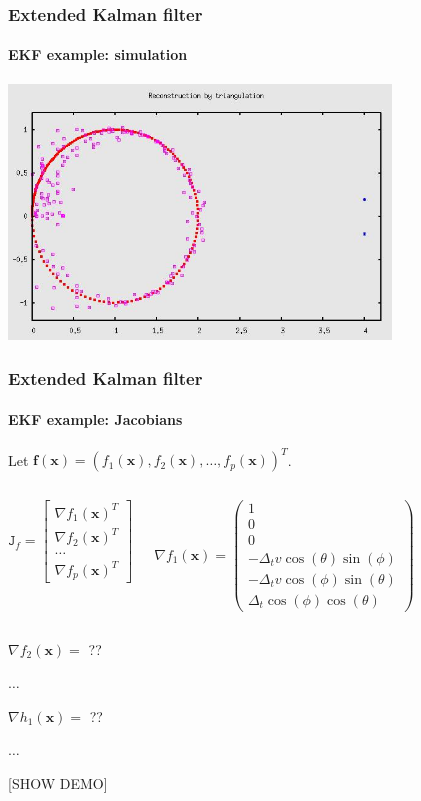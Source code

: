 \documentclass[aspectratio=169]{beamer}
\renewcommand{\vec}[1]{\boldsymbol{#1}}
\newcommand{\mat}[1]{\mathtt{#1}}
\begin{document}
\begin{frame}
\frametitle{Extended Kalman filter}
\framesubtitle{EKF example: simulation}
\begin{center}
\includegraphics[width=4in]{triangulate}
\end{center}
\end{frame}

\begin{frame}
\frametitle{Extended Kalman filter}
\framesubtitle{EKF example: Jacobians}
Let $\vec{f}(\vec{x}) = ( f_1(\vec{x}), f_2(\vec{x}), \ldots,
f_p(\vec{x}) )^T$.

\begin{columns}
\column{3cm}
\begin{equation*}
\mat{J}_f = \begin{bmatrix} \nabla f_1(\vec{x})^T \\
\nabla f_2(\vec{x})^T \\ \ldots \\ \nabla f_p(\vec{x})^T \end{bmatrix}
\end{equation*}

\column{5cm}
\begin{equation*} \nabla f_1(\vec{x}) =
\begin{pmatrix} 1 \\ 0 \\ 0 \\
 -\Delta_t v \cos(\theta) \sin(\phi) \\ -\Delta_t v \cos(\phi)
  \sin(\theta) \\ \Delta_t \cos(\phi) \cos(\theta)
\end{pmatrix} \end{equation*}
\end{columns}

\medskip
$\nabla f_2(\vec{x}) = $ ??

$\ldots$

\medskip
$\nabla h_1(\vec{x}) = $ ??

$\ldots$

\medskip

\alert{[SHOW DEMO]}

\end{frame}
\end{document}
